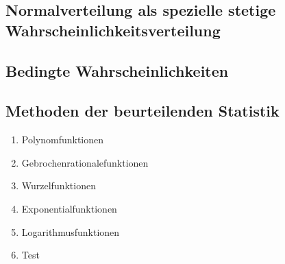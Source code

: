 \documentclass{article}
\begin{document}
\subsection{Normalverteilung als spezielle stetige Wahrscheinlichkeitsverteilung}
\subsection{Bedingte Wahrscheinlichkeiten}
\subsection{Methoden der beurteilenden Statistik}


\begin{enumerate}
    \item Polynomfunktionen
    \item Gebrochenrationalefunktionen
    \item Wurzelfunktionen
    \item Exponentialfunktionen
    \item Logarithmusfunktionen
    \item Test
\end{enumerate}
\end{document}
